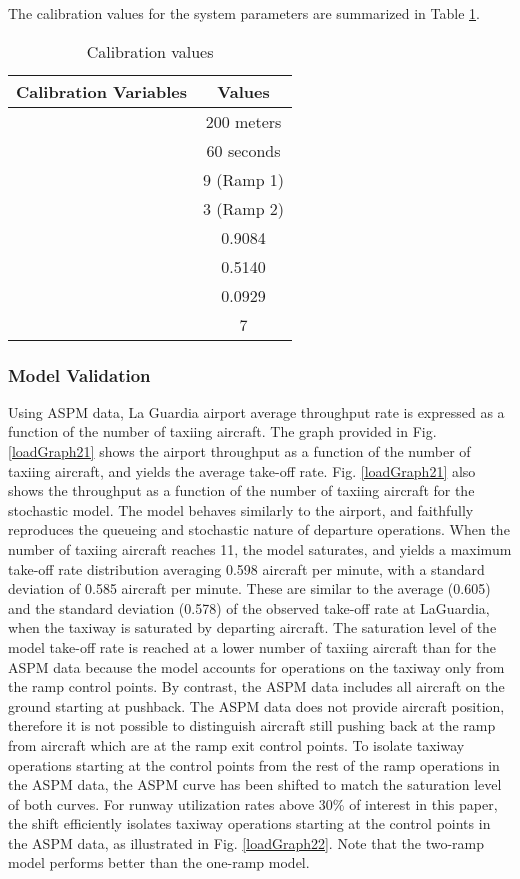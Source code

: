 \documentclass[letterpaper]{article}
\begin{document}
The calibration values for the system parameters are summarized in Table \ref{table:calibration}.

\begin{table}[h]
  \caption{Calibration values}
  \begin{center}
\begin{tabular}{c|c}
  \hline
  \hline
  \textbf{Calibration Variables} & \textbf{Values}\\
\hline
   & 200 meters\\
   & 60 seconds\\
   & 9 (Ramp 1)\\
  & 3 (Ramp 2)\\
   & 0.9084\\
   & 0.5140\\
   & 0.0929\\
   & 7\\
  \hline
  \hline
\end{tabular}
\end{center}
\label{table:calibration}
\end{table}

\subsubsection{Model Validation}
Using ASPM data, La Guardia airport average throughput rate is expressed as a function of the number of taxiing aircraft. The graph provided in
  Fig. \ref{loadGraph21} shows the airport throughput as a function of the number of taxiing aircraft, and yields the average take-off rate.
Fig. \ref{loadGraph21}  also shows the throughput as a function of the number of taxiing aircraft for the stochastic model.
The model behaves similarly to the airport, and faithfully reproduces the queueing and stochastic nature of departure operations. 
When the number of taxiing aircraft reaches 11, the model saturates, and yields a maximum take-off rate distribution averaging 0.598 
aircraft per minute, with a standard deviation of 0.585 aircraft per minute. These are similar to the average (0.605) and the standard 
deviation (0.578) of the observed take-off rate at LaGuardia, when the taxiway is saturated by departing aircraft. The saturation level of the 
model take-off rate is reached at a lower number of taxiing aircraft than for the ASPM data because the model accounts for operations
 on the taxiway only from the ramp control points. By contrast, the ASPM data includes all aircraft on the ground starting at pushback.
  The ASPM data does not provide aircraft position, therefore it is not possible to distinguish aircraft still pushing back at the ramp 
  from aircraft which are at the ramp exit control points. To isolate taxiway operations starting at the control points from the rest of
   the ramp operations in the ASPM data, the ASPM curve has been shifted to match the saturation level of both curves. For runway utilization
    rates above 30\% of interest in this paper, the shift efficiently isolates taxiway operations starting at the control points in the ASPM data, as illustrated 
    in Fig. \ref{loadGraph22}. Note that the two-ramp model performs better than the one-ramp model.  
\end{document}
